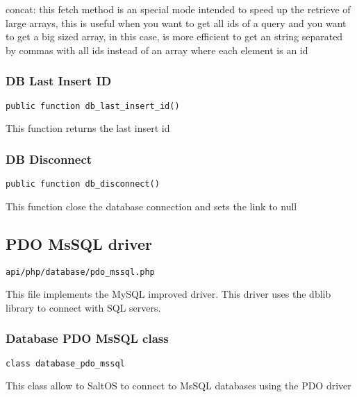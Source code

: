 \documentclass[a4paper]{article}
\begin{document}
concat: this fetch method is an special mode intended to speed up the retrieve of large
arrays, this is useful when you want to get all ids of a query and you want to get a big
sized array, in this case, is more efficient to get an string separated by commas with all
ids instead of an array where each element is an id

\hypertarget{toc325}{}
\subsubsection{DB Last Insert ID}

\begin{lstlisting}
public function db_last_insert_id()
\end{lstlisting}

This function returns the last insert id

\hypertarget{toc326}{}
\subsubsection{DB Disconnect}

\begin{lstlisting}
public function db_disconnect()
\end{lstlisting}

This function close the database connection and sets the link to null

\hypertarget{toc327}{}
\subsection{PDO MsSQL driver}

\begin{lstlisting}
api/php/database/pdo_mssql.php
\end{lstlisting}

This file implements the MySQL improved driver. This driver uses the dblib library to connect
with SQL servers.

\hypertarget{toc328}{}
\subsubsection{Database PDO MsSQL class}

\begin{lstlisting}
class database_pdo_mssql
\end{lstlisting}

This class allow to SaltOS to connect to MsSQL databases using the PDO driver
\end{document}
